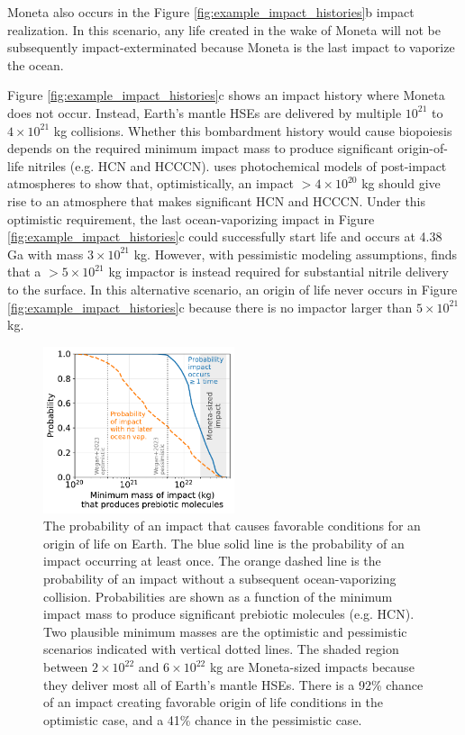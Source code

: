 \documentclass[manuscript]{aastex63}
\begin{document}
Moneta also occurs in the Figure \ref{fig:example_impact_histories}b impact realization. In this scenario, any life created in the wake of Moneta will not be subsequently impact-exterminated because Moneta is the last impact to vaporize the ocean.

Figure \ref{fig:example_impact_histories}c shows an impact history where Moneta does not occur. Instead, Earth's mantle HSEs are delivered by multiple $10^{21}$ to $4 \times 10^{21}$ kg collisions. Whether this bombardment history would cause biopoiesis depends on the required minimum impact mass to produce significant origin-of-life nitriles (e.g. HCN and HCCCN). \citet{Wogan_2023} uses photochemical models of post-impact atmospheres to show that, optimistically, an impact $> 4 \times 10^{20}$ kg should give rise to an atmosphere that makes significant HCN and HCCCN. Under this optimistic requirement, the last ocean-vaporizing impact in Figure \ref{fig:example_impact_histories}c could successfully start life and occurs at 4.38 Ga with mass $3 \times 10^{21}$ kg. However, with pessimistic modeling assumptions, \citet{Wogan_2023} finds that a $> 5 \times 10^{21}$ kg impactor is instead required for substantial nitrile delivery to the surface. In this alternative scenario, an origin of life never occurs in Figure \ref{fig:example_impact_histories}c because there is no impactor larger than $5 \times 10^{21}$ kg.

\begin{figure}
  \centering
  \includegraphics[width=0.5\textwidth]{figures/probabilities_of_impacts.pdf}
  \caption{The probability of an impact that causes favorable conditions for an origin of life on Earth. The blue solid line is the probability of an impact occurring at least once. The orange dashed line is the probability of an impact without a subsequent ocean-vaporizing collision. Probabilities are shown as a function of the minimum impact mass to produce significant prebiotic molecules (e.g. HCN). Two plausible minimum masses are the \citet{Wogan_2023} optimistic and pessimistic scenarios indicated with vertical dotted lines. The shaded region between $2 \times 10^{22}$ and $6 \times 10^{22}$ kg are Moneta-sized impacts because they deliver most all of Earth's mantle HSEs. There is a 92\% chance of an impact creating favorable origin of life conditions in the \citet{Wogan_2023} optimistic case, and a 41\% chance in the pessimistic case.}
  \label{fig:probabilities_of_impacts}
\end{figure}
\end{document}
